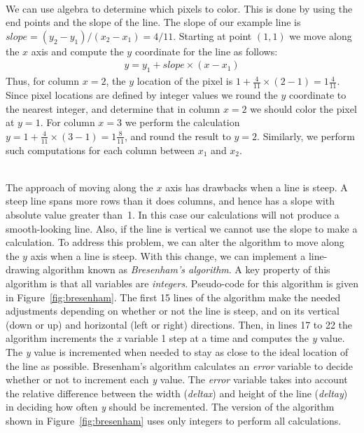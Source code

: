 \documentclass[epsfig,10pt,fullpage]{article}
\begin{document}
~\\
\noindent
We can use algebra to determine which pixels to color. This is done by using the end points and 
the slope of the line. The slope of our example line is $slope = (y_2 - y_1)/(x_2 - x_1) = 4/11$. 
Starting at point $(1,1)$ we move along the $x$ axis and compute the $y$ coordinate for the 
line as follows:
\begin{eqnarray*}
y = y_1 + slope \times (x - x_1)
\end{eqnarray*}
\noindent
Thus, for column $x = 2$, the $y$ location of the pixel is
$1 + \frac{4}{11} \times (2-1) = 1 \frac{4}{11}$. 
Since pixel locations are defined by integer values we round the $y$ coordinate to the nearest 
integer, and determine that in column $x = 2$ we should color the pixel at $y = 1$. For
column $x = 3$ we perform the calculation $y = 1 + \frac{4}{11} \times (3-1) = 1
\frac{8}{11}$, and round the result to $y = 2$.  Similarly, we perform such computations 
for each column between $x_1$ and $x_2$.

~\\
\noindent
The approach of moving along the $x$ axis has drawbacks when a line is steep. A steep line
spans more rows than it does columns, and hence has a slope with absolute value greater than~1.
In this case our calculations will not produce a smooth-looking line.  Also, if the line
is vertical we cannot use the slope to make a calculation.  To address this 
problem, we can alter the algorithm to move along the $y$ axis when a line is steep. With 
this change, we can implement a line-drawing algorithm known as {\it Bresenham's algorithm}.
A key property of this algorithm is that all variables are {\it integers}.
Pseudo-code for this algorithm is given in Figure~\ref{fig:bresenham}. The first 15
lines of the algorithm make the needed adjustments depending on whether or not the line is
steep, and on its vertical (down or up) and horizontal (left or right) directions.
Then, in lines 17 to 22 the algorithm increments the {\it x} variable 1 step at a time
and computes the {\it y} value. The {\it y} value is incremented when needed to stay as
close to the ideal location of the line as possible. Bresenham's algorithm calculates an
{\it error} variable to decide whether or not to increment each {\it y} value.
The {\it error} variable takes into account the relative difference
between the width ({\it deltax}) and height of the line ({\it deltay}) in deciding
how often {\it y} should be incremented. The version of the algorithm shown in 
Figure~\ref{fig:bresenham} uses only integers to perform all calculations. 
\end{document}
